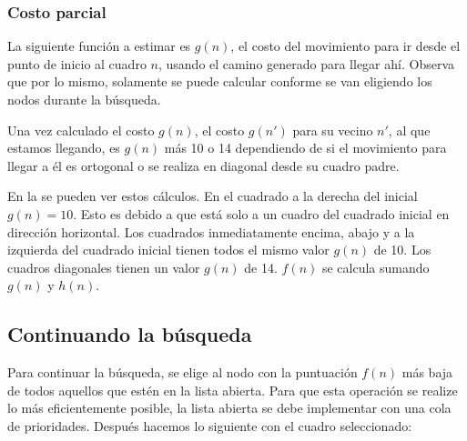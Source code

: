 \subsubsection{Costo parcial}

La siguiente función a estimar es \(g(n)\), el costo del movimiento para ir desde el punto de inicio al cuadro \(n\), usando el camino generado para llegar ahí.  Observa que por lo mismo, solamente se puede calcular conforme se van eligiendo los nodos durante la búsqueda.

Una vez calculado el costo \(g(n)\), el costo \(g(n')\) para su vecino $n'$, al que estamos llegando, es \(g(n)\) más 10 o 14 dependiendo de si el movimiento para llegar a él es ortogonal o se realiza en diagonal desde su cuadro padre.

En la  se pueden ver estos cálculos.  En el cuadrado a la derecha del inicial \(g(n)=10\). Esto es debido a que está solo a un cuadro del cuadrado inicial en dirección horizontal. Los cuadrados inmediatamente encima, abajo y a la izquierda del cuadrado inicial tienen todos el mismo valor \(g(n)\) de 10. Los cuadros diagonales tienen un valor \(g(n)\) de 14.  \(f(n)\) se calcula sumando \(g(n)\) y \(h(n)\).


\subsection{Continuando la b\'usqueda}

Para continuar la búsqueda, se elige al nodo con la puntuación \(f(n)\) más baja de todos aquellos que estén en la lista abierta. Para que esta operación se realize lo más eficientemente posible, la lista abierta se debe implementar con una cola de prioridades. Después hacemos lo siguiente con el cuadro seleccionado:

